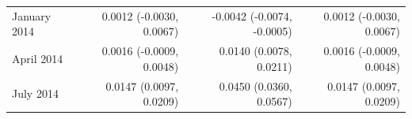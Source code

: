 \begin{tabular}{lrrr}
January 2014 & 0.0012 (-0.0030, 0.0067) & -0.0042 (-0.0074, -0.0005) & 0.0012 (-0.0030, 0.0067) \\
April 2014 & 0.0016 (-0.0009, 0.0048) & 0.0140 (0.0078, 0.0211) & 0.0016 (-0.0009, 0.0048) \\
July 2014 & 0.0147 (0.0097, 0.0209) & 0.0450 (0.0360, 0.0567) & 0.0147 (0.0097, 0.0209) \\

\end{tabular}
